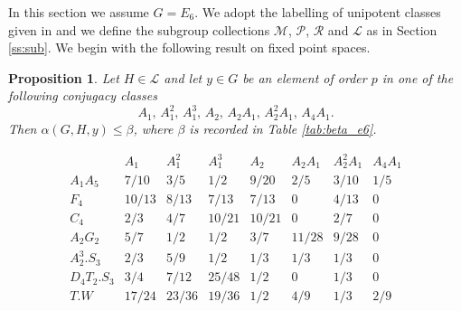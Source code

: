\documentclass[twoside,a4paper,reqno,11pt]{amsart}
\renewcommand{\a}{\alpha}
\renewcommand{\b}{\beta}
\newcommand{\<}{\langle}
\renewcommand{\>}{\rangle}
\newcommand{\leqs}{\leqslant}
\renewcommand{\:}{\colon}
\theoremstyle{plain}
\newtheorem{prop}[thm]{Proposition}
\theoremstyle{definition}
\begin{document}
In this section we assume $G = E_6$. We adopt the labelling of unipotent classes given in \cite[Table 22.1.3]{LS_book} and we define the subgroup collections $\mathcal{M}$, $\mathcal{P}$, $\mathcal{R}$ and $\mathcal{L}$ as in Section \ref{ss:sub}. We begin with the following result on fixed point spaces. 

\begin{prop}\label{p:e6_dim3}
Let $H \in \mathcal{L}$ and let $y \in G$ be an element of order $p$ in one of the following conjugacy classes
\[
A_1, \, A_1^2, \, A_1^3, \, A_2, \, A_2A_1, \, A_2^2A_1, \, A_4A_1. 
\]
Then $\a(G,H,y) \leqs \b$, where $\b$ is recorded in Table \ref{tab:beta_e6}.
\end{prop}

{\small
\begin{table}
\[
\begin{array}{l|ccccccc}
& A_1 & A_1^2 & A_1^3 & A_2 & A_2A_1 & A_2^2A_1 & A_4A_1  \\ \hline
A_1A_5 & 7/10 & 3/5 & 1/2 & 9/20 & 2/5 & 3/10 & 1/5 \\
F_4 & 10/13 & 8/13 & 7/13 & 7/13 & 0 & 4/13 & 0 \\
C_4 & 2/3 & 4/7 & 10/21 & 10/21 & 0 & 2/7 & 0 \\
A_2G_2 & 5/7 & 1/2 & 1/2 & 3/7 & 11/28 & 9/28 & 0 \\
A_2^3.S_3 & 2/3 & 5/9 & 1/2 & 1/3 & 1/3 & 1/3 & 0 \\
D_4T_2.S_3 & 3/4 & 7/12 & 25/48 & 1/2 & 0 & 1/3 & 0 \\
T.W & 17/24 & 23/36 & 19/36 & 1/2 & 4/9 & 1/3 & 2/9 \\ 
 \end{array}
\]
\caption{The upper bound $\a(G,H,y) \leqs \b$ in Proposition \ref{p:e6_dim3}}
\label{tab:beta_e6}
\end{table}}
\end{document}
